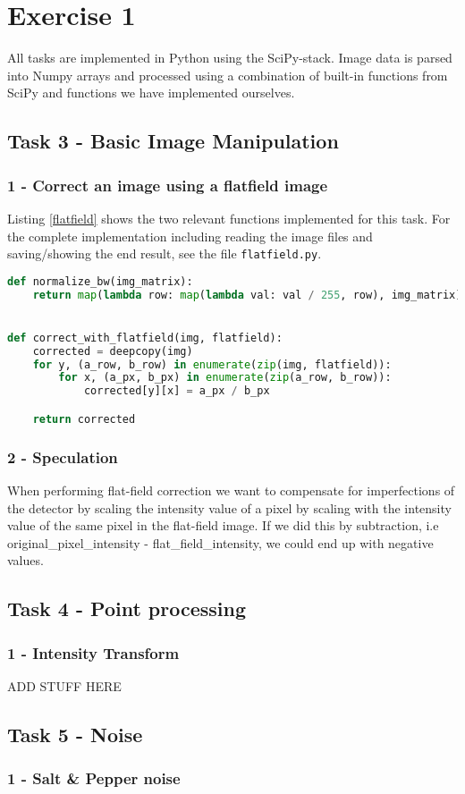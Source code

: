 \chapter{Exercise 1}

All tasks are implemented in Python using the SciPy-stack.
Image data is parsed into Numpy arrays and processed using a combination of built-in functions from SciPy and functions we have implemented ourselves.

\section*{Task 3 - Basic Image Manipulation}

\subsection*{1 - Correct an image using a flatfield image}

Listing \ref{flatfield} shows the two relevant functions implemented for this task.
For the complete implementation including reading the image files and saving/showing the end result, see the file \texttt{flatfield.py}.

\begin{lstlisting}[language=Python, label=flatfield, caption=Flatfield image correction]
def normalize_bw(img_matrix):
    return map(lambda row: map(lambda val: val / 255, row), img_matrix)


def correct_with_flatfield(img, flatfield):
    corrected = deepcopy(img)
    for y, (a_row, b_row) in enumerate(zip(img, flatfield)):
        for x, (a_px, b_px) in enumerate(zip(a_row, b_row)):
            corrected[y][x] = a_px / b_px

    return corrected
\end{lstlisting}

\subsection*{2 - Speculation}

When performing flat-field correction we want to compensate for imperfections of the detector by scaling the intensity value of a pixel by scaling with the intensity value of the same pixel in the flat-field image.
If we did this by subtraction, i.e original_pixel_intensity - flat_field_intensity, we could end up with negative values.




\section*{Task 4 - Point processing}

\subsection*{1 - Intensity Transform}

ADD STUFF HERE

\section*{Task 5 - Noise}

\subsection*{1 - Salt \& Pepper noise}

